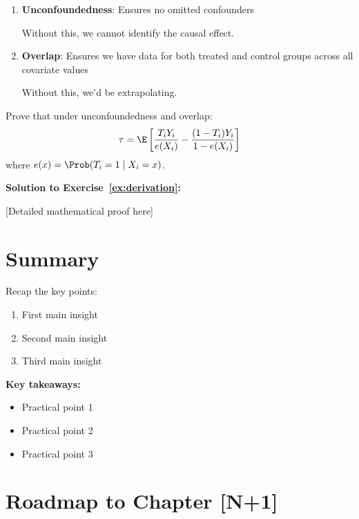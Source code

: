 \begin{enumerate}
    \item \textbf{Unconfoundedness}: Ensures no omitted confounders

    Without this, we cannot identify the causal effect.

    \item \textbf{Overlap}: Ensures we have data for both treated and control groups across all covariate values

    Without this, we'd be extrapolating.
\end{enumerate}

\begin{exercise}
\label{ex:derivation}
Prove that under unconfoundedness and overlap:
\[
\tau = \E\left[\frac{T_i Y_i}{e(X_i)} - \frac{(1-T_i)Y_i}{1-e(X_i)}\right]
\]
where $e(x) = \Prob(T_i=1 \mid X_i=x)$.
\end{exercise}

\textbf{Solution to Exercise~\ref{ex:derivation}:}

[Detailed mathematical proof here]


\section{Summary}

Recap the key points:
\begin{enumerate}
    \item First main insight
    \item Second main insight
    \item Third main insight
\end{enumerate}

\textbf{Key takeaways:}
\begin{itemize}
    \item Practical point 1
    \item Practical point 2
    \item Practical point 3
\end{itemize}


\section{Roadmap to Chapter [N+1]}

